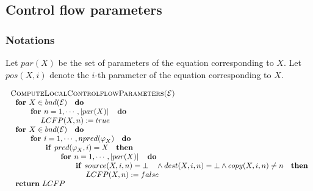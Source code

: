 \documentclass{article}
\begin{document}
\newpage

\subsection{Control flow parameters}

\subsubsection{Notations}

Let $par(X)$ be the set of parameters of the equation corresponding to $X$.
Let $pos(X,i)$ denote the $i$-th parameter of the equation corresponding to $%
X$.

\begin{equation*}
\begin{tabular}{l}
\textsc{ComputeLocalControlflowParameters(}$\mathcal{E}$\textsc{)} \\ 
$\text{\textbf{for }}X\in bnd(\mathcal{E})\text{ \textbf{do}}$ \\ 
$\qquad \text{\textbf{for }}n=1,\cdots ,\left\vert par(X)\right\vert \text{ 
\textbf{do}}$ \\ 
$\qquad \qquad LCFP(X,n):=true$ \\ 
$\text{\textbf{for }}X\in bnd(\mathcal{E})\text{ \textbf{do}}$ \\ 
$\qquad \text{\textbf{for }}i=1,\cdots ,npred(\varphi _{X})\text{ \textbf{do}%
}$ \\ 
$\qquad \qquad \text{\textbf{if }}pred(\varphi _{X},i)=X\text{ \textbf{then}}
$ \\ 
$\qquad \qquad \qquad \text{\textbf{for }}n=1,\cdots ,\left\vert
par(X)\right\vert \text{ \textbf{do}}$ \\ 
$\qquad \qquad \qquad \qquad \text{\textbf{if }}source(X,i,n)=\bot \text{ }%
\wedge dest(X,i,n)=\bot \wedge copy(X,i,n)\neq n\text{ \textbf{then}}$ \\ 
$\qquad \qquad \qquad \qquad \qquad LCFP(X,n):=false$ \\ 
$\text{\textbf{return} }LCFP$%
\end{tabular}%
\end{equation*}%
\end{document}

